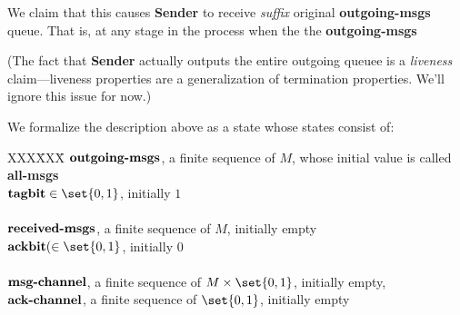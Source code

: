 We claim that this causes \textbf{Sender} to receive \emph{suffix}
original \textbf{outgoing-msgs} queue.  That is, at any stage in the
process when the the \textbf{outgoing-msgs}

(The fact that \textbf{Sender} actually outputs the entire outgoing
queuee is a \emph{liveness} claim---liveness properties are a
generalization of termination properties.  We'll ignore this issue for
now.)

We formalize the description above as a state whose states consist of:
\begin{tabbing}
XXX\=XXX\= \kill \> $\text{\textbf{outgoing-msgs}}$, a finite sequence of $M$,
whose initial value is called \textbf{all-msgs}\\ \> $\text{\textbf{tagbit}} \in
\set{0, 1}$, initially $1$ \\ \\ \> $\text{\textbf{received-msgs}}$, a finite
sequence of $M$, initially empty\\ \> $\text{\textbf{ackbit}}( \in \set{0, 1}$,
initially $0$ \\ \\ \> $\text{\textbf{msg-channel}}$, a finite sequence of $M
\times \set{0, 1}$, initially empty, \\ \> $\text{\textbf{ack-channel}}$, a
finite sequence of $\set{0, 1}$, initially empty
\end{tabbing}


